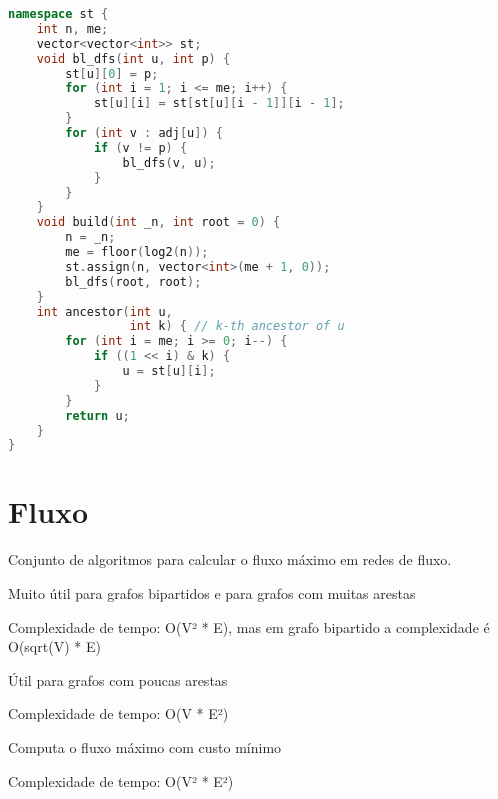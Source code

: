 \documentclass[11pt, a4paper, oneside]{book}
\begin{document}
\hfill

\begin{multicols}{2}
\begin{lstlisting}[language=C++]
namespace st {
    int n, me;
    vector<vector<int>> st;
    void bl_dfs(int u, int p) {
        st[u][0] = p;
        for (int i = 1; i <= me; i++) {
            st[u][i] = st[st[u][i - 1]][i - 1];
        }
        for (int v : adj[u]) {
            if (v != p) {
                bl_dfs(v, u);
            }
        }
    }
    void build(int _n, int root = 0) {
        n = _n;
        me = floor(log2(n));
        st.assign(n, vector<int>(me + 1, 0));
        bl_dfs(root, root);
    }
    int ancestor(int u,
                 int k) { // k-th ancestor of u
        for (int i = me; i >= 0; i--) {
            if ((1 << i) & k) {
                u = st[u][i];
            }
        }
        return u;
    }
}
\end{lstlisting}
\end{multicols}

\hfill

\section{Fluxo}


Conjunto de algoritmos para calcular o fluxo máximo em redes de fluxo.



\textbf{} 


Muito útil para grafos bipartidos e para grafos com muitas arestas



Complexidade de tempo: O(V² * E), mas em grafo bipartido a complexidade é O(sqrt(V) * E)



\textbf{} 


Útil para grafos com poucas arestas



Complexidade de tempo: O(V * E²)



\textbf{} 


Computa o fluxo máximo com custo mínimo



Complexidade de tempo: O(V² * E²)

\hfill
\end{document}
